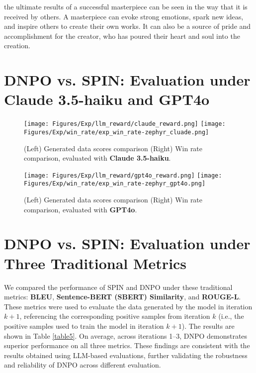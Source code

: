 \begin{appendices}
the ultimate results of a successful masterpiece can be seen in the way that it is received by others. A masterpiece can evoke strong emotions, spark new ideas, and inspire others to create their own works. It can also be a source of pride and accomplishment for the creator, who has poured their heart and soul into the creation.

\newpage
\section{DNPO vs. SPIN: Evaluation under Claude 3.5-haiku and GPT4o}
\label{appendix e}
\begin{figure}[h]
    \centering
    \texttt{[image: Figures/Exp/llm\_reward/claude\_reward.png]}
    \texttt{[image: Figures/Exp/win\_rate/exp\_win\_rate-zephyr\_cluade.png]}
    \caption{
        (Left) Generated data scores comparison
        (Right) Win rate comparison, evaluated with \textbf{Claude 3.5-haiku}.
    }
\end{figure}


\begin{figure}[h]
    \centering
    \texttt{[image: Figures/Exp/llm\_reward/gpt4o\_reward.png]}
    \texttt{[image: Figures/Exp/win\_rate/exp\_win\_rate-zephyr\_gpt4o.png]}
    \caption{
        (Left) Generated data scores comparison
        (Right) Win rate comparison, evaluated with \textbf{GPT4o}.
    }
\end{figure}


\section{DNPO vs. SPIN: Evaluation under Three Traditional Metrics}
\label{appendix f}
We compared the performance of SPIN and DNPO under these traditional metrics: \textbf{BLEU}, \textbf{Sentence-BERT (SBERT) Similarity}, and \textbf{ROUGE-L}. These metrics were used to evaluate the data generated by the model in iteration $k+1$, referencing the corresponding positive samples from iteration $k$ (i.e., the positive samples used to train the model in iteration $k+1$). The results are shown in Table \ref{table5}. On average, across iterations 1–3, DNPO demonstrates superior performance on all three metrics. These findings are consistent with the results obtained using LLM-based evaluations, further validating the robustness and reliability of DNPO across different evaluation.


\end{appendices}
